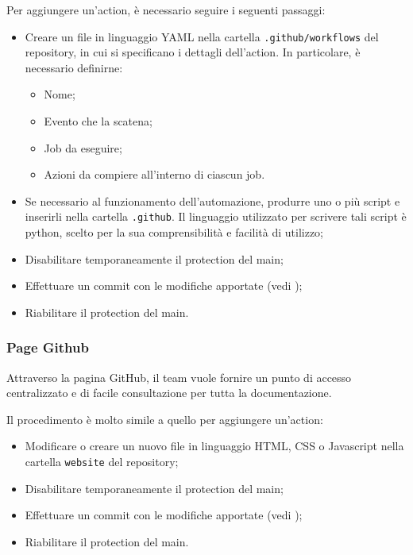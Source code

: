 Per aggiungere un'action, è necessario seguire i seguenti passaggi:
\begin{itemize}
      \item Creare un file in linguaggio YAML nella cartella \texttt{.github/workflows} del
            repository, in cui si specificano i dettagli dell'action. In particolare, è
            necessario definirne:
            \begin{itemize}
                  \item Nome;
                  \item Evento che la scatena;
                  \item Job da eseguire;
                  \item Azioni da compiere all'interno di ciascun job.
            \end{itemize}
      \item Se necessario al funzionamento dell'automazione, produrre uno o più script e
            inserirli nella cartella \texttt{.github}. Il linguaggio utilizzato per
            scrivere tali script è python, scelto per la sua comprensibilità e facilità di
            utilizzo;
      \item Disabilitare temporaneamente il protection del main;
      \item Effettuare un commit con le modifiche apportate (vedi );
      \item Riabilitare il protection del main.
\end{itemize}

\subsubsection{Page Github}
Attraverso la pagina GitHub, il team vuole fornire un punto di accesso centralizzato e di facile consultazione per tutta la documentazione.

Il procedimento è molto simile a quello per aggiungere un'action:
\begin{itemize}
      \item Modificare o creare un nuovo file in linguaggio HTML, CSS o Javascript nella cartella \texttt{website} del repository;
      \item Disabilitare temporaneamente il protection del main;
      \item Effettuare un commit con le modifiche apportate (vedi );
      \item Riabilitare il protection del main.
\end{itemize}

